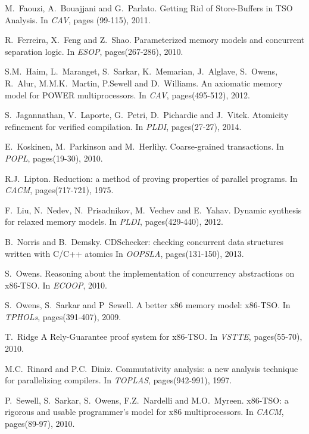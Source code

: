 \documentclass[preprint,9pt]{sigplanconf}
\begin{document}
\begin{thebibliography}{10}
M.~Faouzi, A.~Bouajjani and G.~Parlato.
\newblock Getting Rid of Store-Buffers in TSO Analysis.
\newblock In {\em CAV}, pages (99-115), 2011.

R.~Ferreira, X.~Feng and Z.~Shao.
\newblock Parameterized memory models and concurrent separation logic.
\newblock In {\em ESOP}, pages(267-286), 2010.

S.M.~Haim, L.~Maranget, S.~Sarkar, K.~Memarian, J.~Alglave, S.~Owens, R.~Alur, M.M.K.~Martin, P.Sewell and D.~Williams.
\newblock An axiomatic memory model for POWER multiprocessors.
\newblock In {\em CAV}, pages(495-512), 2012.

S.~Jagannathan, V.~Laporte, G.~Petri, D.~Pichardie and J.~Vitek.
\newblock Atomicity refinement for verified compilation.
\newblock In {\em PLDI}, pages(27-27), 2014.

E.~Koskinen, M.~Parkinson and M.~Herlihy.
\newblock Coarse-grained transactions.
\newblock In {\em POPL}, pages(19-30), 2010.

R.J.~Lipton.
\newblock Reduction: a method of proving properties of parallel programs.
\newblock In {\em CACM}, pages(717-721), 1975.

F.~Liu, N.~Nedev, N.~Prisadnikov, M.~Vechev and E.~Yahav.
\newblock Dynamic synthesis for relaxed memory models. 
\newblock In {\em PLDI}, pages(429-440), 2012.

B.~Norris and B.~Demsky.
\newblock CDSchecker: checking concurrent data structures written with C/C++ atomics
\newblock In {\em OOPSLA}, pages(131-150), 2013.

S.~Owens.
\newblock Reasoning about the implementation of concurrency abstractions on x86-TSO.
\newblock In {\em ECOOP}, 2010.

S.~Owens, S.~Sarkar and P~Sewell.
\newblock A better x86 memory model: x86-TSO.
\newblock In {\em TPHOLs}, pages(391-407), 2009.

T.~Ridge
\newblock A Rely-Guarantee proof system for x86-TSO.
\newblock In {\em VSTTE}, pages(55-70), 2010.

M.C.~Rinard and P.C.~Diniz.
\newblock Commutativity analysis: a new analysis technique for parallelizing compilers.
\newblock In {\em TOPLAS}, pages(942-991), 1997.

P.~Sewell, S.~Sarkar, S.~Owens, F.Z.~Nardelli and M.O.~Myreen.
\newblock x86-TSO: a rigorous and usable programmer's model for x86 multiprocessors.
\newblock In {\em CACM}, pages(89-97), 2010.


\end{thebibliography}
\end{document}
